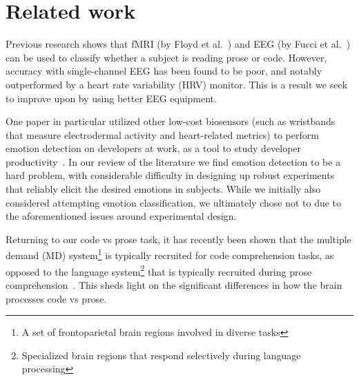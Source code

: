 \section{Related work}


    Previous research shows that fMRI (by Floyd et al.~\cite{floyd_decoding_2017}) and EEG (by Fucci et al.~\cite{fucci_replication_2019}) can be used to classify whether a subject is reading prose or code. However, accuracy with single-channel EEG has been found to be poor, and notably outperformed by a heart rate variability (HRV) monitor. This is a result we seek to improve upon by using better EEG equipment.

    One paper in particular utilized other low-cost biosensors (such as wristbands that measure electrodermal activity and heart-related metrics) to perform emotion detection on developers at work, as a tool to study developer productivity~\cite{girardi_recognizing_2020}. In our review of the literature we find emotion detection to be a hard problem, with considerable difficulty in designing up robust experiments that reliably elicit the desired emotions in subjects. While we initially also considered attempting emotion classification, we ultimately chose not to due to the aforementioned issues around experimental design.

    Returning to our code vs prose task, it has recently been shown that the multiple demand (MD) system\footnote{A set of frontoparietal brain regions involved in diverse tasks} is typically recruited for code comprehension tasks, as opposed to the language system\footnote{Specialized brain regions that respond selectively during language processing} that is typically recruited during prose comprehension~\cite{ivanova_comprehension_2020}. This sheds light on the significant differences in how the brain processes code vs prose.

